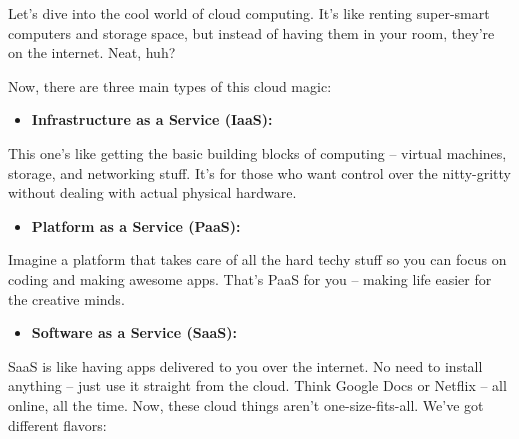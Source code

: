 \documentclass[
  letterpaper,
  DIV=11,
  numbers=noendperiod]{scrreprt}
\providecommand{\tightlist}{%
  \setlength{\itemsep}{0pt}\setlength{\parskip}{0pt}}\usepackage{longtable,booktabs,array}
\begin{document}
Let's dive into the cool world of cloud computing. It's like renting
super-smart computers and storage space, but instead of having them in
your room, they're on the internet. Neat, huh?

Now, there are three main types of this cloud magic:

\begin{itemize}
\tightlist
\item
  \textbf{Infrastructure as a Service (IaaS):}
\end{itemize}

This one's like getting the basic building blocks of computing --
virtual machines, storage, and networking stuff. It's for those who want
control over the nitty-gritty without dealing with actual physical
hardware.

\begin{itemize}
\tightlist
\item
  \textbf{Platform as a Service (PaaS):}
\end{itemize}

Imagine a platform that takes care of all the hard techy stuff so you
can focus on coding and making awesome apps. That's PaaS for you --
making life easier for the creative minds.

\begin{itemize}
\tightlist
\item
  \textbf{Software as a Service (SaaS):}
\end{itemize}

SaaS is like having apps delivered to you over the internet. No need to
install anything -- just use it straight from the cloud. Think Google
Docs or Netflix -- all online, all the time. Now, these cloud things
aren't one-size-fits-all. We've got different flavors:
\end{document}
